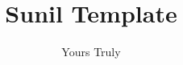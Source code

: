 \documentclass[sunil1,ChapterTOCs]{sunil} %
\begin{document}
\frontmatter

\title{Sunil Template} %
\author{Yours Truly}
\maketitle

%
\tableofcontents
%
%
%
%

\mainmatter






\printindex
\end{document}
